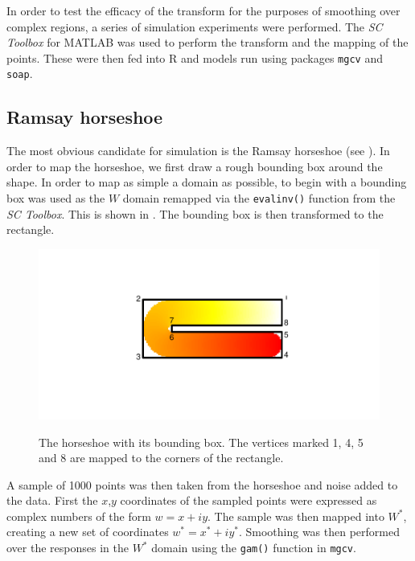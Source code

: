 In order to test the efficacy of the \sch transform for the purposes of smoothing over complex regions, a series of simulation experiments were performed. The \emph{SC Toolbox} for MATLAB was used to perform the transform and the mapping of the points. These were then fed into \textsf{R} and models run using packages \texttt{mgcv} and \texttt{soap}.

\subsection{Ramsay horseshoe}

The most obvious candidate for simulation is the Ramsay horseshoe (see ). In order to map the horseshoe, we first draw a rough bounding box around the shape. In order to map as simple a domain as possible, to begin with a bounding box was used as the $W$ domain remapped via the \texttt{evalinv()} function from the \emph{SC Toolbox}. This is shown in . The bounding box is then transformed to the rectangle. 

\begin{figure}
\centering
\includegraphics[trim=0.5in 1in 0in 0.5in]{sc/figs/hswithboundingbox.pdf} \\
\caption{The horseshoe with its bounding box. The vertices marked 1, 4, 5 and 8 are mapped to the corners of the rectangle.}
\label{hswithboundingbox}
\end{figure}

A sample of 1000 points was then taken from the horseshoe and noise added to the data. First the $x$,$y$ coordinates of the sampled points were expressed as complex numbers of the form $w=x+iy$. The sample was then mapped into $W^*$, creating a new set of coordinates $w^*=x^*+iy^*$. Smoothing was then performed over the responses in the $W^*$ domain using the \texttt{gam()} function in \texttt{mgcv}. 

